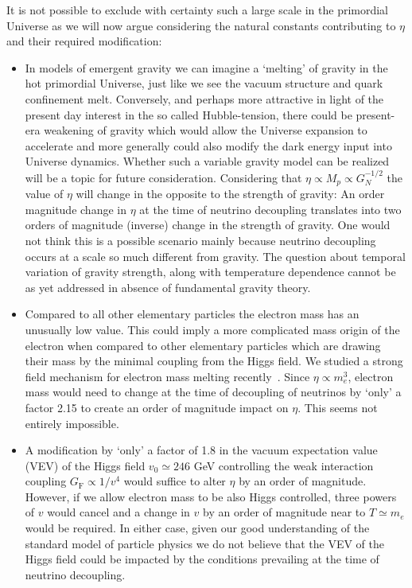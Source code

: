It is not possible to exclude with certainty such a large scale in the primordial Universe as we will now argue considering the natural constants contributing to $\eta$ and their required
modification:
\begin{itemize}
\item
In models of emergent gravity we can imagine a `melting' of gravity in the hot primordial Universe, just like we see the vacuum structure and quark confinement melt. Conversely, and perhaps more attractive in light of the present day interest in the so called Hubble-tension, there could be present-era weakening of gravity which would allow the Universe expansion to accelerate and more generally could also modify the dark energy input into Universe dynamics. Whether such a variable gravity model can be realized will be a topic for future consideration. Considering that $\eta\propto M_p\propto G_N^{-1/2}$ the value of $\eta$ will change in the opposite to the strength of gravity: An order magnitude change in $\eta$ at the time of neutrino decoupling translates into two orders of magnitude (inverse) change in the strength of gravity. One would not think this is a possible scenario mainly because neutrino decoupling occurs at a scale so much different from gravity. The question about temporal variation of gravity strength, along with temperature dependence cannot be as yet addressed in absence of fundamental gravity theory. 
\item
Compared to all other elementary particles the electron mass has an unusually low value. This could imply a more complicated mass origin of the electron when compared to other elementary particles which are drawing their mass by the minimal coupling from the Higgs field. We studied a strong field mechanism for electron mass melting recently~\cite{Evans:2019zyk}. Since $\eta\propto m_e^3$, electron mass would need to change at the time of decoupling of neutrinos by `only' a factor 2.15 to create an order of magnitude impact on $\eta$. This seems not entirely impossible.
\item
A modification by `only' a factor of 1.8 in the vacuum expectation value (VEV) of the Higgs field $v_0\simeq 246$ GeV controlling the weak interaction coupling $G_\mathrm{F}\propto 1/v^4$ would suffice to alter $\eta$ by an order of magnitude. However, if we allow electron mass to be also Higgs controlled, three powers of $v$ would cancel and a change in $v$ by an order of magnitude near to $T\simeq m_e$ would be required. In either case, given our good understanding of the standard model of particle physics we do not believe that the VEV of the Higgs field could be impacted by the conditions prevailing at the time of neutrino decoupling.
\end{itemize}
